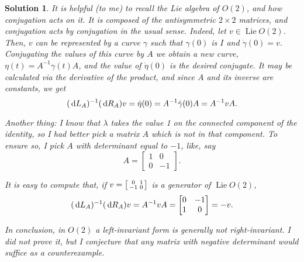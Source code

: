 \documentclass{article}
\theoremstyle{nonumberplain}
\newtheorem{sol}{Solution}
\DeclareMathOperator{\Lie}{Lie}
\begin{document}
\begin{sol}
It is helpful (to me) to recall the Lie algebra of $O(2)$, and how conjugation acts on it. It is composed of the antisymmetric $2 \times 2$ matrices, and conjugation acts by conjugation in the usual sense. Indeed, let $v \in \Lie O(2)$. Then, $v$ can be represented by a curve $\gamma$ such that $\gamma(0)$ is $I$ and $\dot\gamma(0) = v$. Conjugating the values of this curve by $A$ we obtain a new curve, $\eta(t) = A^{-1} \gamma(t) A$, and the value of $\dot\eta(0)$ is the desired conjugate. It may be calculated via the derivative of the product, and since $A$ and its inverse are constants, we get
\[(\dl L_A)^{-1} (\dl R_A) v = \dot \eta(0) = A^{-1} \dot\gamma(0) A = A^{-1} v A.\]

Another thing: I know that $\lambda$ takes the value 1 on the connected component of the identity, so I had better pick a matrix $A$ which is not in that component. To ensure so, I pick $A$ with determinant equal to $-1$, like, say
\[A = \begin{bmatrix}
1 & 0 \\
0 & -1
\end{bmatrix}.\]

It is easy to compute that, if $v = \begin{bsmallmatrix} 0 & 1 \\ -1 & 0 \end{bsmallmatrix}$ is a generator of $\Lie O(2)$,
\[(\dl L_A)^{-1} (\dl R_A) v = A^{-1} v A = \begin{bmatrix} 0&-1\\1&0 \end{bmatrix} = -v.\]

In conclusion, in $O(2)$ a left-invariant form is generally not right-invariant. I did not prove it, but I conjecture that any matrix with negative determinant would suffice as a counterexample.
\end{sol}
\end{document}
